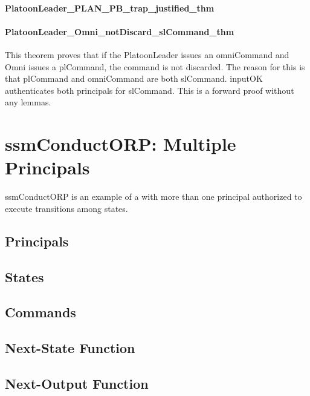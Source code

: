 \documentclass[../../main/main.tex]{subfiles}
\begin{document}
\paragraph*{PlatoonLeader_PLAN_PB_trap_justified_thm}
\HOLssmPBIntegratedTheoremsPlatoonLeaderXXPLANXXPBXXtrapXXlemma
{}\HOLssmPBIntegratedTheoremsPlatoonLeaderXXPLANXXPBXXtrapXXjustifiedXXlemma
\HOLssmPBIntegratedTheoremsPlatoonLeaderXXPLANXXPBXXtrapXXjustifiedXXthm

\paragraph*{PlatoonLeader_Omni_notDiscard_slCommand_thm}
This theorem proves that if the PlatoonLeader issues an omniCommand and Omni issues a plCommand, the command is not discarded.  The reason for this is that plCommand and omniCommand are both slCommand.  inputOK authenticates both principals for slCommand.  This is a forward proof without any lemmas.

\HOLssmPBIntegratedTheoremsPlatoonLeaderXXOmniXXnotDiscardXXslCommandXXthm

     
\section{ssmConductORP: Multiple Principals}
ssmConductORP is an example of a  with more than one principal authorized to execute transitions among states.

\subsection{Principals}
\subsection{States}
\subsection{Commands}
\subsection{Next-State Function}
\subsection{Next-Output Function}
\end{document}
